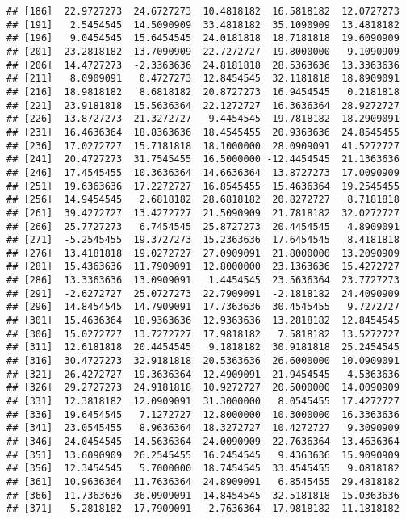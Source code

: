 \documentclass[]{book}
\begin{document}
\begin{verbatim}
## [186]  22.9727273  24.6727273  10.4818182  16.5818182  12.0727273
## [191]   2.5454545  14.5090909  33.4818182  35.1090909  13.4818182
## [196]   9.0454545  15.6454545  24.0181818  18.7181818  19.6090909
## [201]  23.2818182  13.7090909  22.7272727  19.8000000   9.1090909
## [206]  14.4727273  -2.3363636  24.8181818  28.5363636  13.3363636
## [211]   8.0909091   0.4727273  12.8454545  32.1181818  18.8909091
## [216]  18.9818182   8.6818182  20.8727273  16.9454545   0.2181818
## [221]  23.9181818  15.5636364  22.1272727  16.3636364  28.9272727
## [226]  13.8727273  21.3272727   9.4454545  19.7818182  18.2909091
## [231]  16.4636364  18.8363636  18.4545455  20.9363636  24.8545455
## [236]  17.0272727  15.7181818  18.1000000  28.0909091  41.5272727
## [241]  20.4727273  31.7545455  16.5000000 -12.4454545  21.1363636
## [246]  17.4545455  10.3636364  14.6636364  13.8727273  17.0090909
## [251]  19.6363636  17.2272727  16.8545455  15.4636364  19.2545455
## [256]  14.9454545   2.6818182  28.6818182  20.8272727   8.7181818
## [261]  39.4272727  13.4272727  21.5090909  21.7818182  32.0272727
## [266]  25.7727273   6.7454545  25.8727273  20.4454545   4.8909091
## [271]  -5.2545455  19.3727273  15.2363636  17.6454545   8.4181818
## [276]  13.4181818  19.0272727  27.0909091  21.8000000  13.2090909
## [281]  15.4363636  11.7909091  12.8000000  23.1363636  15.4272727
## [286]  13.3363636  13.0909091   1.4454545  23.5636364  23.7727273
## [291]  -2.6272727  25.0727273  22.7909091  -2.1818182  24.4090909
## [296]  14.8454545  14.7909091  17.7363636  30.4545455   9.7272727
## [301]  15.4636364  18.9363636  12.9363636  13.2818182  12.8454545
## [306]  15.0272727  13.7272727  17.9818182   7.5818182  13.5272727
## [311]  12.6181818  20.4454545   9.1818182  30.9181818  25.2454545
## [316]  30.4727273  32.9181818  20.5363636  26.6000000  10.0909091
## [321]  26.4272727  19.3636364  12.4909091  21.9454545   4.5363636
## [326]  29.2727273  24.9181818  10.9272727  20.5000000  14.0090909
## [331]  12.3818182  12.0909091  31.3000000   8.0545455  17.4272727
## [336]  19.6454545   7.1272727  12.8000000  10.3000000  16.3363636
## [341]  23.0545455   8.9636364  18.3272727  10.4272727   9.3090909
## [346]  24.0454545  14.5636364  24.0090909  22.7636364  13.4636364
## [351]  13.6090909  26.2545455  16.2454545   9.4363636  15.9090909
## [356]  12.3454545   5.7000000  18.7454545  33.4545455   9.0818182
## [361]  10.9636364  11.7636364  24.8909091   6.8545455  29.4818182
## [366]  11.7363636  36.0909091  14.8454545  32.5181818  15.0363636
## [371]   5.2818182  17.7909091   2.7636364  17.9818182  11.1818182

\end{verbatim}
\end{document}
